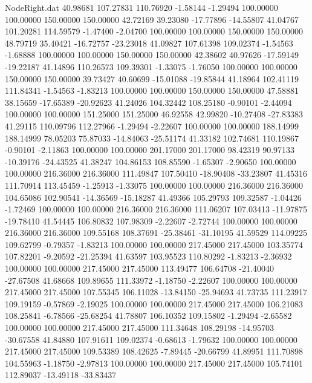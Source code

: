\begin{filecontents}{NodeRight.dat}
  40.98681  107.27831  110.76920    -1.58144   -1.29494  100.00000  100.00000  150.00000  150.00000   42.72169   39.23080  -17.77896  -14.55807
  41.04767  101.20281  114.59579    -1.47400   -2.04700  100.00000  100.00000  150.00000  150.00000   48.79719   35.40421  -16.72757  -23.23018
  41.09827  107.61398  109.02374    -1.54563   -1.68888  100.00000  100.00000  150.00000  150.00000   42.38602   40.97626  -17.59149  -19.22187
  41.14896  110.26573  109.39301    -1.33075   -1.76050  100.00000  100.00000  150.00000  150.00000   39.73427   40.60699  -15.01088  -19.85844
  41.18964  102.41119  111.84341    -1.54563   -1.83213  100.00000  100.00000  150.00000  150.00000   47.58881   38.15659  -17.65389  -20.92623
  41.24026  104.32442  108.25180    -0.90101   -2.44094  100.00000  100.00000  151.25000  151.25000   46.92558   42.99820  -10.27408  -27.83383
  41.29115  110.09796  112.27966    -1.29494   -2.22607  100.00000  100.00000  188.14999  188.14999   78.05203   75.87033  -14.84063  -25.51174
  41.33182  102.74681  110.19867    -0.90101   -2.11863  100.00000  100.00000  201.17000  201.17000   98.42319   90.97133  -10.39176  -24.43525
  41.38247  104.86153  108.85590    -1.65307   -2.90650  100.00000  100.00000  216.36000  216.36000  111.49847  107.50410  -18.90408  -33.23807
  41.45316  111.70914  113.45459    -1.25913   -1.33075  100.00000  100.00000  216.36000  216.36000  104.65086  102.90541  -14.36569  -15.18287
  41.49366  105.29793  109.32587    -1.04426   -1.72469  100.00000  100.00000  216.36000  216.36000  111.06207  107.03413  -11.97875  -19.78410
  41.54445  106.80832  107.98309    -2.22607   -2.72744  100.00000  100.00000  216.36000  216.36000  109.55168  108.37691  -25.38461  -31.10195
  41.59529  114.09225  109.62799    -0.79357   -1.83213  100.00000  100.00000  217.45000  217.45000  103.35774  107.82201   -9.20592  -21.25394
  41.63597  103.95523  110.80292    -1.83213   -2.36932  100.00000  100.00000  217.45000  217.45000  113.49477  106.64708  -21.40040  -27.67508
  41.68668  109.89655  111.33972    -1.18750   -2.22607  100.00000  100.00000  217.45000  217.45000  107.55345  106.11028  -13.84150  -25.94693
  41.73735  111.23917  109.19159    -0.57869   -2.19025  100.00000  100.00000  217.45000  217.45000  106.21083  108.25841   -6.78566  -25.68254
  41.78807  106.10352  109.15802    -1.29494   -2.65582  100.00000  100.00000  217.45000  217.45000  111.34648  108.29198  -14.95703  -30.67558
  41.84880  107.91611  109.02374    -0.68613   -1.79632  100.00000  100.00000  217.45000  217.45000  109.53389  108.42625   -7.89445  -20.66799
  41.89951  111.70898  104.55963    -1.18750   -2.97813  100.00000  100.00000  217.45000  217.45000  105.74101  112.89037  -13.49118  -33.83437

\end{filecontents}
